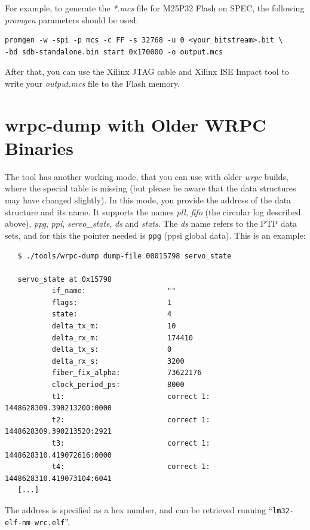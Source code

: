 \documentclass[a4paper, 12pt]{article}
\begin{document}
For example, to generate the \textit{*.mcs} file for M25P32 Flash on SPEC, the
following \textit{promgen} parameters should be used:
\begin{lstlisting}
promgen -w -spi -p mcs -c FF -s 32768 -u 0 <your_bitstream>.bit \
-bd sdb-standalone.bin start 0x170000 -o output.mcs
\end{lstlisting}

After that, you can use the Xilinx JTAG cable and Xilinx ISE Impact tool to
write your \textit{output.mcs} file to the Flash memory.
\newpage
\section{wrpc-dump with Older WRPC Binaries}
\label{wrpc-dump with Older WRPC Binaries}

The tool has another working mode, that you can use with older
\textit{wrpc} builds, where the special table is missing (but please be
aware that the data structures may have changed slightly).  In this
mode, you provide the address of the data structure and its name. It
supports the names \textit{pll}, \textit{fifo} (the circular log described
above), \textit{ppg}, \textit{ppi}, \textit{servo\_state}, \textit{ds} and
\textit{stats}. The \textit{ds} name
refers to the PTP data sets, and for this the pointer needed is
\texttt{ppg} (ppsi global data).
This is an example:

\begin{lstlisting}
   $ ./tools/wrpc-dump dump-file 00015798 servo_state

   servo_state at 0x15798
           if_name:                   ""
           flags:                     1
           state:                     4
           delta_tx_m:                10
           delta_rx_m:                174410
           delta_tx_s:                0
           delta_rx_s:                3200
           fiber_fix_alpha:           73622176
           clock_period_ps:           8000
           t1:                        correct 1: 1448628309.390213200:0000
           t2:                        correct 1: 1448628309.390213520:2921
           t3:                        correct 1: 1448628310.419072616:0000
           t4:                        correct 1: 1448628310.419073104:6041
   [...]
\end{lstlisting}

The address is specified as a hex number, and can be retrieved running
``\texttt{lm32-elf-nm  wrc.elf}''.
\end{document}
